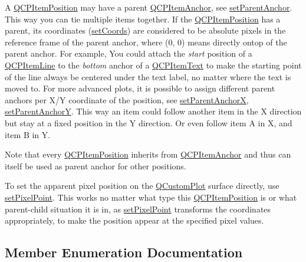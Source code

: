 A \hyperlink{classQCPItemPosition}{Q\+C\+P\+Item\+Position} may have a parent \hyperlink{classQCPItemAnchor}{Q\+C\+P\+Item\+Anchor}, see \hyperlink{classQCPItemPosition_ac094d67a95d2dceafa0d50b9db3a7e51}{set\+Parent\+Anchor}. This way you can tie multiple items together. If the \hyperlink{classQCPItemPosition}{Q\+C\+P\+Item\+Position} has a parent, its coordinates (\hyperlink{classQCPItemPosition_aa988ba4e87ab684c9021017dcaba945f}{set\+Coords}) are considered to be absolute pixels in the reference frame of the parent anchor, where (0, 0) means directly ontop of the parent anchor. For example, You could attach the {\itshape start} position of a \hyperlink{classQCPItemLine}{Q\+C\+P\+Item\+Line} to the {\itshape bottom} anchor of a \hyperlink{classQCPItemText}{Q\+C\+P\+Item\+Text} to make the starting point of the line always be centered under the text label, no matter where the text is moved to. For more advanced plots, it is possible to assign different parent anchors per X/\+Y coordinate of the position, see \hyperlink{classQCPItemPosition_add71461a973927c74e42179480916d9c}{set\+Parent\+Anchor\+X}, \hyperlink{classQCPItemPosition_add5ec1db9d19cec58a3b5c9e0a0c3f9d}{set\+Parent\+Anchor\+Y}. This way an item could follow another item in the X direction but stay at a fixed position in the Y direction. Or even follow item A in X, and item B in Y.

Note that every \hyperlink{classQCPItemPosition}{Q\+C\+P\+Item\+Position} inherits from \hyperlink{classQCPItemAnchor}{Q\+C\+P\+Item\+Anchor} and thus can itself be used as parent anchor for other positions.

To set the apparent pixel position on the \hyperlink{classQCustomPlot}{Q\+Custom\+Plot} surface directly, use \hyperlink{classQCPItemPosition_ab404e56d9ac2ac2df0382c57933a71ef}{set\+Pixel\+Point}. This works no matter what type this \hyperlink{classQCPItemPosition}{Q\+C\+P\+Item\+Position} is or what parent-\/child situation it is in, as \hyperlink{classQCPItemPosition_ab404e56d9ac2ac2df0382c57933a71ef}{set\+Pixel\+Point} transforms the coordinates appropriately, to make the position appear at the specified pixel values. 

\subsection{Member Enumeration Documentation}
\hypertarget{classQCPItemPosition_aad9936c22bf43e3d358552f6e86dbdc8}{}
